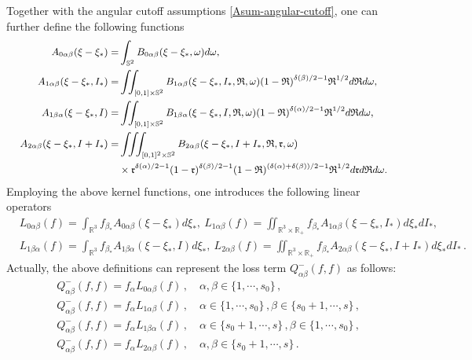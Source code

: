 \documentclass[reqno,11pt]{amsart}
\numberwithin{equation}{section}
\def\no{\nonumber}
\def\R{\mathbb{R}}
\begin{document}
Together with the angular cutoff assumptions \eqref{Asum-angular-cutoff}, one can further define the following functions
\begin{equation}\label{A}{\small
    \begin{aligned}
		A_{0 \alpha \beta } (\xi-\xi_*)=&\int_{\mathbb{S}^2 } B_{0 \alpha \beta }(\xi-\xi_*,\omega ) d\omega, \\
		A_{1\alpha \beta }(\xi-\xi_*,I_*)= &\iint_{[0,1] \times \mathbb{S}^2 } B_{1 \alpha \beta } (\xi-\xi_*,I_*,\mathfrak{R}, \omega )(1-\mathfrak{R})^{\delta(\beta )/2-1}\mathfrak{R}^{1/2} d\mathfrak{R}d\omega, \\
		A_{1 \beta \alpha }(\xi-\xi_*,I)=&\iint_{[0,1] \times \mathbb{S}^2 } B_{1 \beta \alpha }(\xi-\xi_*,I,\mathfrak{R},\omega) (1-\mathfrak{R})^{\delta(\alpha )/2-1}\mathfrak{R}^{1/2} d\mathfrak{R}d\omega, \\
		A_{2\alpha \beta } (\xi-\xi_*,I+I_*)=&\iiint_{[0,1]^2 \times \mathbb{S}^2 } B_{2\alpha \beta }(\xi-\xi_*,I+I_*,\mathfrak{R},\mathfrak{r},\omega ) \\
     & \times \mathfrak{r}^{\delta(\alpha )/2-1} (1-\mathfrak{r})^{\delta(\beta )/2-1} (1-\mathfrak{R})^{(\delta(\alpha)+\delta (\beta ))/2-1} \mathfrak{R}^{1/2} d\mathfrak{r}d\mathfrak{R}d\omega .
    \end{aligned}}
\end{equation}
Employing the above kernel functions, one introduces the following linear operators
{\small
    \begin{align}\label{L-def}
		\no & L_{0\alpha \beta }(f)= \int_{ \R^3} f_{\beta_*} A_{0\alpha \beta }(\xi-\xi_*)d\xi_*, \ L_{1\alpha \beta }(f)= \iint_{ \R^3\times \R_+} f_{\beta_*} A_{1\alpha \beta }(\xi-\xi_*,I_*)d\xi_* dI_*,\\
		& L_{1\beta \alpha }(f)= \int_{ \R^3} f_{\beta_*} A_{1\beta \alpha }(\xi-\xi_*,I)d\xi_*,\ L_{2\alpha \beta }(f)= \iint_{ \R^3\times \R_+} f_{\beta_*} A_{2\alpha \beta }(\xi-\xi_*,I+I_*)d\xi_* dI_* \,.
	\end{align}}
Actually, the above definitions can represent the loss term $Q_{\alpha \beta}^- (f,f)$ as follows:
  \begin{align}\label{Qn-alpha-beta}
    \no & Q_{\alpha \beta}^- (f,f) = f_\alpha L_{0 \alpha \beta} (f) \,, \quad \alpha, \beta \in \{ 1, \cdots, s_0 \} \,, \\
    \no & Q_{\alpha \beta}^- (f,f) = f_\alpha L_{1 \alpha \beta} (f) \,, \quad \alpha \in \{ 1, \cdots, s_0 \} \,, \beta \in \{ s_0 + 1, \cdots, s \} \,, \\
    \no & Q_{\alpha \beta}^- (f,f) = f_\alpha L_{1 \beta \alpha} (f) \,, \quad \alpha \in \{ s_0 + 1, \cdots, s \} \,, \beta \in \{ 1, \cdots, s_0 \} \,, \\
    & Q_{\alpha \beta}^- (f,f) = f_\alpha L_{2 \alpha \beta} (f) \,, \quad \alpha, \beta \in \{ s_0 + 1, \cdots, s \} \,.
  \end{align}
\end{document}
